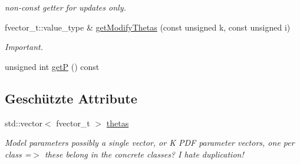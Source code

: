 \begin{DoxyCompactItemize}
\begin{DoxyCompactList}\small\item\em non-\/const getter for updates only. \item\end{DoxyCompactList}\item 
\hypertarget{classCDA_1_1EMThetas_acc1246f42ca1fa55d8f7d1338dee39ef}{
fvector\_\-t::value\_\-type \& \hyperlink{classCDA_1_1EMThetas_acc1246f42ca1fa55d8f7d1338dee39ef}{getModifyThetas} (const unsigned k, const unsigned i)}
\label{classCDA_1_1EMThetas_acc1246f42ca1fa55d8f7d1338dee39ef}

\begin{DoxyCompactList}\small\item\em Important. \item\end{DoxyCompactList}\item 
unsigned int \hyperlink{classCDA_1_1EMThetas_aeafa1d8926150ea06a4f76228817d38e}{getP} () const 
\end{DoxyCompactItemize}
\subsection*{Geschützte Attribute}
\begin{DoxyCompactItemize}
\item 
\hypertarget{classCDA_1_1EMThetas_a2fb1c00c889f9a5bfe95e65ba1c4b132}{
std::vector$<$ fvector\_\-t $>$ \hyperlink{classCDA_1_1EMThetas_a2fb1c00c889f9a5bfe95e65ba1c4b132}{thetas}}
\label{classCDA_1_1EMThetas_a2fb1c00c889f9a5bfe95e65ba1c4b132}

\begin{DoxyCompactList}\small\item\em Model parameters possibly a single vector, or K PDF parameter vectors, one per class =$>$ these belong in the concrete classes? I hate duplication! \item\end{DoxyCompactList}\end{DoxyCompactItemize}


